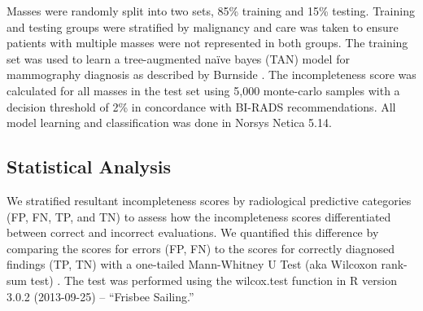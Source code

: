 Masses were randomly split into two sets, 85\% training and 15\% testing. Training and testing groups were stratified by malignancy and care was taken to ensure patients with multiple masses were not represented in both groups. The training set was used to learn a tree-augmented na\"{i}ve bayes (TAN) model for mammography diagnosis as described by Burnside \cite{Burnside:2009br, Friedman:1997gw}. The incompleteness score was calculated for all masses in the test set using 5,000 monte-carlo samples with a decision threshold of 2\% in concordance with BI-RADS recommendations. All model learning and classification was done in Norsys Netica 5.14.

\subsection{Statistical Analysis}
We stratified resultant incompleteness scores by radiological predictive categories (FP, FN, TP, and TN) to assess how the incompleteness scores differentiated between correct and incorrect evaluations. We quantified this difference by comparing the scores for errors (FP, FN) to the scores for correctly diagnosed findings (TP, TN) with a one-tailed Mann-Whitney U Test (aka Wilcoxon rank-sum test) \cite{Wilcoxon:1945tm}. The test was performed using the wilcox.test function in R version 3.0.2 (2013-09-25) -- ``Frisbee Sailing.''
